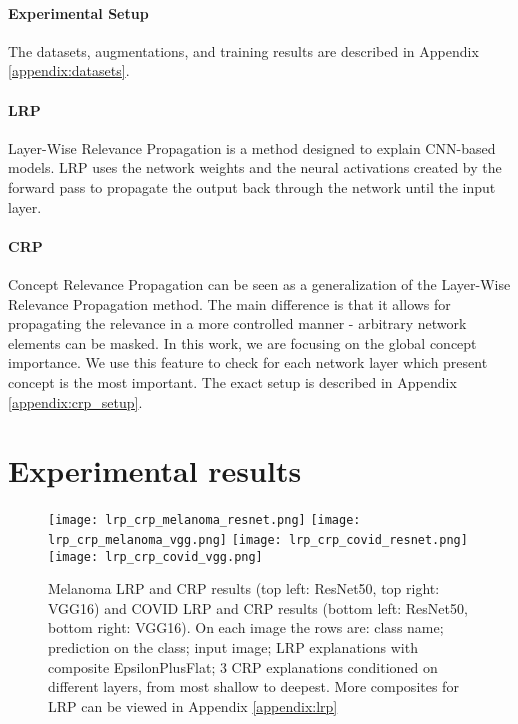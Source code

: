 \documentclass[twoside,11pt]{article}
\begin{document}
\paragraph{Experimental Setup}
The datasets, augmentations, and training results are described in Appendix \ref{appendix:datasets}.

\paragraph{LRP}
Layer-Wise Relevance Propagation \citep{Montavon2019} is a method designed to explain CNN-based models.
LRP uses the network weights and the neural activations created by the forward pass to propagate the output back through the network until the input layer.

\paragraph{CRP}
Concept Relevance Propagation \citep{https://doi.org/10.48550/arxiv.2206.03208} can be seen as a generalization of the Layer-Wise Relevance Propagation method. The main difference is that it allows for propagating the relevance in a more controlled manner - arbitrary network elements can be masked. In this work, we are focusing on the global concept importance. We use this feature to check for each network layer which present concept is the most important. The exact setup is described in Appendix \ref{appendix:crp_setup}.




\section{Experimental results}
\begin{figure}[t]
    \centering
    \texttt{[image: lrp\_crp\_melanoma\_resnet.png]}
    \texttt{[image: lrp\_crp\_melanoma\_vgg.png]}
    \texttt{[image: lrp\_crp\_covid\_resnet.png]}
    \texttt{[image: lrp\_crp\_covid\_vgg.png]}
    \caption{
    Melanoma LRP and CRP results (top left: ResNet50, top right: VGG16) and COVID LRP and CRP results (bottom left: ResNet50, bottom right: VGG16).
    On each image the rows are: class name; prediction on the class; input image; LRP explanations with composite EpsilonPlusFlat; 3 CRP explanations conditioned on different layers, from most shallow to deepest.
    More composites for LRP can be viewed in Appendix \ref{appendix:lrp}
    }
    \label{fig:lrp}
\end{figure}
\end{document}
